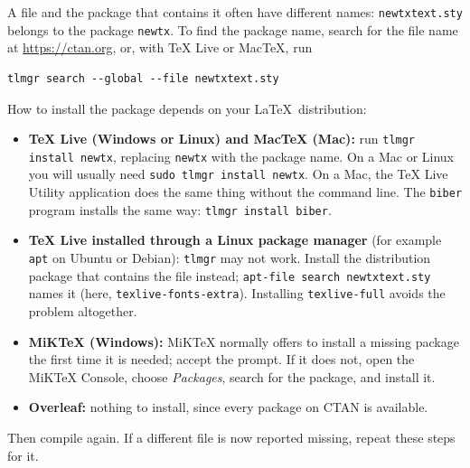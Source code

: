 A file and the package that contains it often have different names: \texttt{newtxtext.sty} belongs to the package \texttt{newtx}. To find the package name, search for the file name at \url{https://ctan.org}, or, with TeX Live or MacTeX, run
\begin{verbatim}
tlmgr search --global --file newtxtext.sty
\end{verbatim}

How to install the package depends on your \LaTeX\ distribution:
\begin{itemize}
\item \textbf{TeX Live (Windows or Linux) and MacTeX (Mac):} run \verb+tlmgr install newtx+, replacing \texttt{newtx} with the package name. On a Mac or Linux you will usually need \verb+sudo tlmgr install newtx+. On a Mac, the TeX Live Utility application does the same thing without the command line. The \texttt{biber} program installs the same way: \verb+tlmgr install biber+.
\item \textbf{TeX Live installed through a Linux package manager} (for example \texttt{apt} on Ubuntu or Debian): \texttt{tlmgr} may not work. Install the distribution package that contains the file instead; \verb+apt-file search newtxtext.sty+ names it (here, \texttt{texlive-fonts-extra}). Installing \texttt{texlive-full} avoids the problem altogether.
\item \textbf{MiKTeX (Windows):} MiKTeX normally offers to install a missing package the first time it is needed; accept the prompt. If it does not, open the MiKTeX Console, choose \emph{Packages}, search for the package, and install it.
\item \textbf{Overleaf:} nothing to install, since every package on CTAN is available.
\end{itemize}
Then compile again. If a different file is now reported missing, repeat these steps for it.
